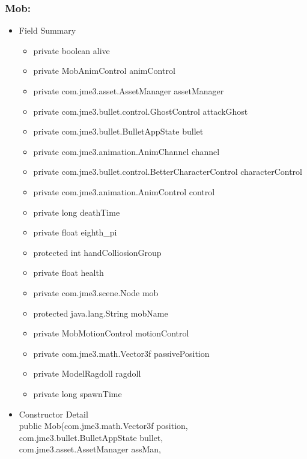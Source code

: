 \documentclass[letterpaper]{article}
\begin{document}
						\subsubsection*{Mob:}
						\vspace{0.1in}
							\begin{itemize}
								\item	Field Summary
										\begin{itemize}
											\item	private boolean	alive 
											\item	private MobAnimControl	animControl 
											\item	private com.jme3.asset.AssetManager	assetManager 
											\item	private com.jme3.bullet.control.GhostControl	attackGhost 
											\item	private com.jme3.bullet.BulletAppState	bullet 
											\item	private com.jme3.animation.AnimChannel	channel 
											\item	private com.jme3.bullet.control.BetterCharacterControl	characterControl 
											\item	private com.jme3.animation.AnimControl	control 
											\item	private long	deathTime 
											\item	private float	eighth\_pi 
											\item	protected int	handColliosionGroup 
											\item	private float	health 
											\item	private com.jme3.scene.Node	mob 
											\item	protected java.lang.String	mobName 
											\item	private MobMotionControl	motionControl 
											\item	private com.jme3.math.Vector3f	passivePosition 
											\item	private ModelRagdoll	ragdoll 
											\item	private long	spawnTime 
										\end{itemize}
								\item	Constructor Detail \\
										public Mob(com.jme3.math.Vector3f position, \\
		  com.jme3.bullet.BulletAppState bullet, \\
		  com.jme3.asset.AssetManager assMan, \\

\end{itemize}
\end{document}
